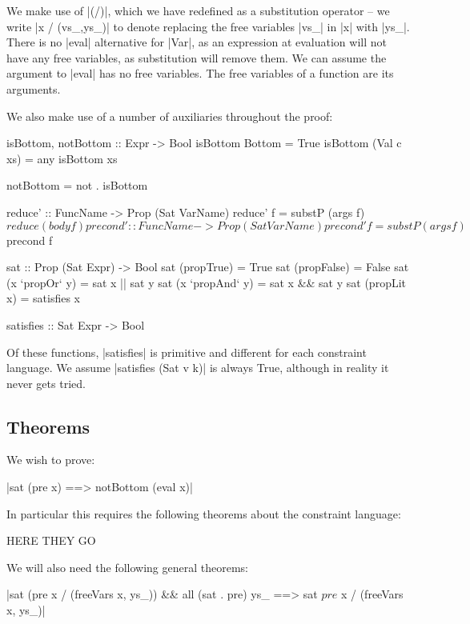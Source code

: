 We make use of |(/)|, which we have redefined as a substitution operator -- we write |x / (vs_,ys_)| to denote replacing the free variables |vs_| in |x| with |ys_|. There is no |eval| alternative for |Var|, as an expression at evaluation will not have any free variables, as substitution will remove them. We can assume the argument to |eval| has no free variables. The free variables of a function are its arguments.

We also make use of a number of auxiliaries throughout the proof:

\begin{code}
isBottom, notBottom :: Expr -> Bool
isBottom Bottom = True
isBottom (Val c xs) = any isBottom xs

notBottom = not . isBottom

reduce' :: FuncName -> Prop (Sat VarName)
reduce' f = substP (args f) $ reduce (body f)

precond' :: FuncName -> Prop (Sat VarName)
precond' f = substP (args f) $ precond f

sat :: Prop (Sat Expr) -> Bool
sat (propTrue) = True
sat (propFalse) = False
sat (x `propOr` y) = sat x || sat y
sat (x `propAnd` y) = sat x && sat y
sat (propLit x) = satisfies x

satisfies :: Sat Expr -> Bool
\end{code}

Of these functions, |satisfies| is primitive and different for each constraint language. We assume |satisfies (Sat v k)| is always True, although in reality it never gets tried.

\subsection{Theorems}

We wish to prove:

{|sat (pre x) ==> notBottom (eval x)|}

In particular this requires the following theorems about the constraint language:

HERE THEY GO

We will also need the following general theorems:

{|sat (pre x / (freeVars x, ys_)) && all (sat . pre) ys_ ==> sat $ pre $ x / (freeVars x, ys_)|}

%
%
%
%
%
%
%
%


